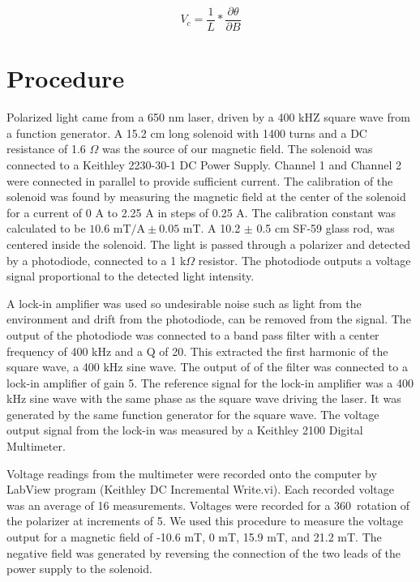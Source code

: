 \documentclass[prb,preprint]{revtex4-1}
\begin{document}
\begin{equation}
V_{c} =\frac{1}{L} * \frac{\partial \theta}{\partial B} 
\end{equation}



\section{Procedure}
{Polarized light came from a 650 nm laser, driven by a 400 kHZ square wave from a function generator. A 15.2 cm long solenoid with 1400 turns and a DC resistance of 1.6 $\Omega$ was the source of our magnetic field. The solenoid was connected to a Keithley 2230-30-1 DC Power Supply. Channel 1 and Channel 2 were connected in parallel to provide sufficient current. The calibration of the solenoid was found by measuring the magnetic field at the center of the solenoid for a current of 0 A to 2.25 A in steps of 0.25 A. The calibration constant was calculated to be $10.6 \textrm{~mT/A} \pm 0.05 \text{~mT}$. A 10.2 $\pm$ 0.5 cm SF-59 glass rod, was centered inside the solenoid. The light is passed through a polarizer and detected by a photodiode, connected to a 1 k$\Omega$ resistor. The photodiode outputs a voltage signal proportional to the detected light intensity.

A lock-in amplifier was used so undesirable noise such as light from the environment and drift from the photodiode, can be removed from the signal. The output of the photodiode was connected to a band pass filter with a center frequency of 400 kHz and a Q of 20. This extracted the first harmonic of the square wave, a 400 kHz sine wave. The output of of the filter was connected to a lock-in amplifier of gain 5. The reference signal for the lock-in amplifier was a 400 kHz sine wave with the same phase as the square wave driving the laser. It was generated by the same function generator for the square wave. The voltage output signal from the lock-in was measured by a Keithley 2100 Digital Multimeter.

Voltage readings from the multimeter were recorded onto the computer by LabView program (Keithley DC Incremental Write.vi). Each recorded voltage was an average of 16 measurements. Voltages were recorded for a 360\degree\ rotation of the polarizer at increments of 5\degree. We used this procedure to measure the voltage output for a magnetic field of -10.6 mT, 0 mT, 15.9 mT, and 21.2 mT. The negative field was generated by reversing the connection of the two leads of the power supply to the solenoid.
}
\end{document}
